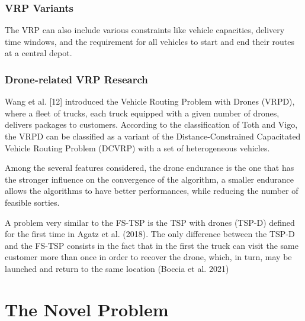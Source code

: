 \documentclass{article}
\begin{document}
	\subsubsection{VRP Variants}
	The VRP can also include various constraints like vehicle capacities, delivery time windows, and the requirement for all vehicles to start and end their routes at a central depot.
	\subsubsection{Drone-related VRP Research}
	Wang et al. [12] introduced the Vehicle Routing Problem with Drones (VRPD), where a ﬂeet of trucks, each truck equipped with a given number of drones, delivers packages to customers. According to the classiﬁcation of Toth and Vigo, the VRPD can be classiﬁed as a variant of the Distance-Constrained Capacitated Vehicle Routing Problem (DCVRP) with a set of heterogeneous vehicles.
	\par 
	Among the several features considered, the drone endurance is the one that
	has the stronger influence on the convergence of the algorithm, a smaller endurance
	allows the algorithms to have better performances, while reducing the number of
	feasible sorties.
	\par 
	A problem very similar to the FS-TSP is the TSP with drones (TSP-D) defined for the first time in Agatz et al. (2018). The only
	difference between the TSP-D and the FS-TSP consists in the fact that in the first the truck can visit the same customer more than once in
	order to recover the drone, which, in turn, may be launched and return to the same location (Boccia et al. 2021)
	\section{The Novel Problem}
	
\end{document}
